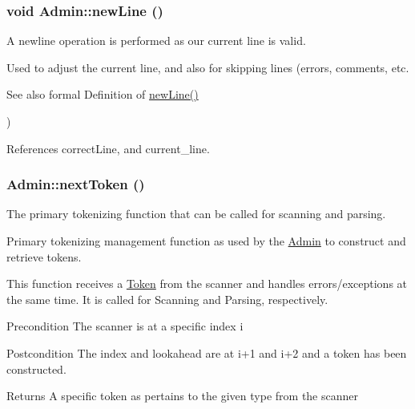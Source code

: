 \hypertarget{classAdmin_ae121a9ce2a34ac4075d074c2d1f306c5}{
\subsubsection[{newLine}]{\setlength{\rightskip}{0pt plus 5cm}void Admin::newLine ()}}
\label{classAdmin_ae121a9ce2a34ac4075d074c2d1f306c5}


A newline operation is performed as our current line is valid. 

Used to adjust the current line, and also for skipping lines (errors, comments, etc.

\begin{DoxySeeAlso}{See also}
formal Definition of \hyperlink{classAdmin_ae121a9ce2a34ac4075d074c2d1f306c5}{newLine()}
\end{DoxySeeAlso}
) 

References correctLine, and current\_\-line.

\hypertarget{classAdmin_a7d32bf0c9bcc29be8f622e9b07cfb3d8}{
\subsubsection[{nextToken}]{ Admin::nextToken ()}}
\label{classAdmin_a7d32bf0c9bcc29be8f622e9b07cfb3d8}


The primary tokenizing function that can be called for scanning and parsing. 

Primary tokenizing management function as used by the \hyperlink{classAdmin}{Admin} to construct and retrieve tokens.

This function receives a \hyperlink{classToken}{Token} from the scanner and handles errors/exceptions at the same time. It is called for Scanning and Parsing, respectively.

\begin{DoxyPrecond}{Precondition}
The scanner is at a specific index i 
\end{DoxyPrecond}
\begin{DoxyPostcond}{Postcondition}
The index and lookahead are at i+1 and i+2 and a token has been constructed. 
\end{DoxyPostcond}
\begin{DoxyReturn}{Returns}
A specific token as pertains to the given type from the scanner 
\end{DoxyReturn}


